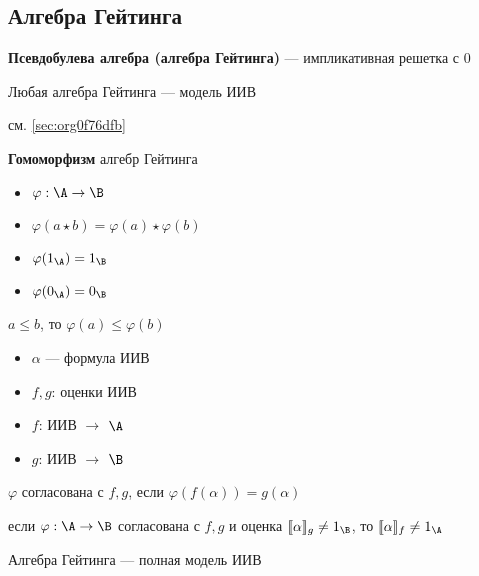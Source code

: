 \documentclass[english]{article}
\begin{document}
\subsection{Алгебра Гейтинга}
\label{sec:org1214ac6}
\begin{definition}
	\textbf{Псевдобулева алгебра (алгебра Гейтинга)} --- импликативная решетка с \(0\)
	\label{org05378cc}
\end{definition}
\begin{theorem}
	Любая алгебра Гейтинга --- модель ИИВ
	\label{orgf0f6370}
\end{theorem}
\begin{examp}
	см. \ref{sec:org0f76dfb}
\end{examp}
\begin{definition}
	\textbf{Гомоморфизм} алгебр Гейтинга \\
	\begin{itemize}
		\item \(\varphi: \A \to \B\)
		\item \(\varphi(a \star b) = \varphi(a)\star\varphi(b)\)
		\item \(\varphi(1_\A) = 1_\B\)
		\item \(\varphi(0_\A) = 0_\B\)
	\end{itemize}
	\label{org06d9dd0}
\end{definition}
\begin{theorem}
	\(a \le b\), то \(\varphi(a) \le \varphi(b)\)
	\label{org91b7505}
\end{theorem}
\begin{definition}
	\-
	\begin{itemize}
		\item \(\alpha\) --- формула ИИВ
		\item \(f, g\): оценки ИИВ
		\item \(f\): ИИВ \(\to\) \(\A\)
		\item \(g\): ИИВ \(\to\) \(\B\)
	\end{itemize}
	\(\varphi\) согласована с \(f, g\), если \(\varphi(f(\alpha)) = g(\alpha)\)
	\label{orgde651bd}
\end{definition}
\begin{theorem}
	если \(\varphi: \A \to \B\) согласована с \(f, g\) и оценка \(\llbracket \alpha \rrbracket_g \neq 1_\B\), то \(\llbracket \alpha \rrbracket_f \neq 1_\A\)
	\label{org52e6d4c}
\end{theorem}
\begin{theorem}
	Алгебра Гейтинга --- полная модель ИИВ
	\label{orgaaa3ca9}
\end{theorem}
\end{document}
